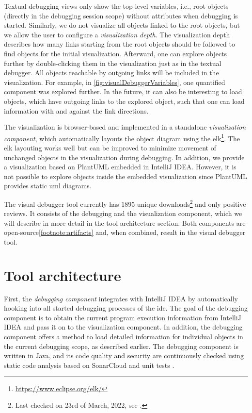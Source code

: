 \documentclass[conference]{IEEEtran}
\newcommand{\intellij}{IntelliJ IDEA}
\begin{document}
Textual debugging views only show the top-level variables, i.e., root objects (directly in the debugging session scope) without attributes when debugging is started.
Similarly, we do not visualize all objects linked to the root objects, but we allow the user to configure a \textit{visualization depth}.
The visualization depth describes how many links starting from the root objects should be followed to find objects for the initial visualization.
Afterward, one can explore objects further by double-clicking them in the visualization just as in the textual debugger.
All objects reachable by outgoing links will be included in the visualization.
For example, in \cref{fig:visualDebuggerVariables}, one quantified component was explored further.
In the future, it can also be interesting to load objects, which have outgoing links to the explored object, such that one can load information with and against the link directions.

The visualization is browser-based and implemented in a standalone \textit{visualization component}, which automatically layouts the object diagram using the \gls*{elk}\footnote{\url{https://www.eclipse.org/elk/}}.
The \gls*{elk} layouting works well but can be improved to minimize movement of unchanged objects in the visualization during debugging.
In addition, we provide a visualization based on PlantUML embedded in \intellij{}.
However, it is not possible to explore objects inside the embedded visualization since PlantUML provides static \gls*{uml} diagrams.

The visual debugger tool currently has 1895 unique downloads\footnote{\label{footnote:pluginStats}Last checked on 23rd of March, 2022, see \cite{VisualDebuggerIntelliJ}.} and only positive reviews.
It consists of the debugging and the visualization component, which we will describe in more detail in the tool architecture section.
Both components are open-source\cref{footnote:artifacts} and, when combined, result in the visual debugger tool.

\section{Tool architecture}  \label{sec:architecture}
First, the \textit{debugging component} integrates with \intellij{} by automatically hooking into all started debugging processes of the \gls*{ide}.
The goal of the debugging component is to obtain the current program execution information from \intellij{} and pass it on to the visualization component.
In addition, the debugging component offers a method to load detailed information for individual objects in the current debugging scope, as described earlier.
The debugging component is written in Java, and its code quality and security are continuously checked using static code analysis based on SonarCloud and unit tests \cite{ArtifactsICSME2022}.
\end{document}

